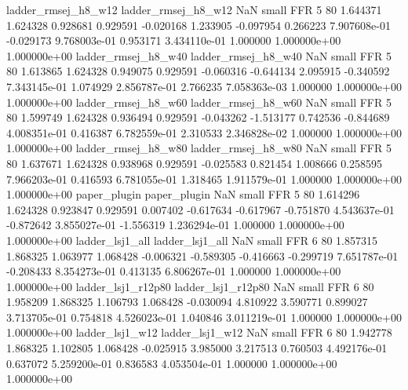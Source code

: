      ladder_rmsej_h8_w12      ladder_rmsej_h8_w12                   NaN      small      FFR                 5 80 1.644371       1.624328 0.928681       0.929591   -0.020168      1.233905     -0.097954     0.266223   7.907608e-01 -0.029173 9.768003e-01     0.953171   3.434110e-01            1.000000    1.000000e+00        1.000000e+00
     ladder_rmsej_h8_w40      ladder_rmsej_h8_w40                   NaN      small      FFR                 5 80 1.613865       1.624328 0.949075       0.929591   -0.060316     -0.644134      2.095915    -0.340592   7.343145e-01  1.074929 2.856787e-01     2.766235   7.058363e-03            1.000000    1.000000e+00        1.000000e+00
     ladder_rmsej_h8_w60      ladder_rmsej_h8_w60                   NaN      small      FFR                 5 80 1.599749       1.624328 0.936494       0.929591   -0.043262     -1.513177      0.742536    -0.844689   4.008351e-01  0.416387 6.782559e-01     2.310533   2.346828e-02            1.000000    1.000000e+00        1.000000e+00
     ladder_rmsej_h8_w80      ladder_rmsej_h8_w80                   NaN      small      FFR                 5 80 1.637671       1.624328 0.938968       0.929591   -0.025583      0.821454      1.008666     0.258595   7.966203e-01  0.416593 6.781055e-01     1.318465   1.911579e-01            1.000000    1.000000e+00        1.000000e+00
            paper_plugin             paper_plugin                   NaN      small      FFR                 5 80 1.614296       1.624328 0.923847       0.929591    0.007402     -0.617634     -0.617967    -0.751870   4.543637e-01 -0.872642 3.855027e-01    -1.556319   1.236294e-01            1.000000    1.000000e+00        1.000000e+00
         ladder_lsj1_all          ladder_lsj1_all                   NaN      small      FFR                 6 80 1.857315       1.868325 1.063977       1.068428   -0.006321     -0.589305     -0.416663    -0.299719   7.651787e-01 -0.208433 8.354273e-01     0.413135   6.806267e-01            1.000000    1.000000e+00        1.000000e+00
      ladder_lsj1_r12p80       ladder_lsj1_r12p80                   NaN      small      FFR                 6 80 1.958209       1.868325 1.106793       1.068428   -0.030094      4.810922      3.590771     0.899027   3.713705e-01  0.754818 4.526023e-01     1.040846   3.011219e-01            1.000000    1.000000e+00        1.000000e+00
         ladder_lsj1_w12          ladder_lsj1_w12                   NaN      small      FFR                 6 80 1.942778       1.868325 1.102805       1.068428   -0.025915      3.985000      3.217513     0.760503   4.492176e-01  0.637072 5.259200e-01     0.836583   4.053504e-01            1.000000    1.000000e+00        1.000000e+00
